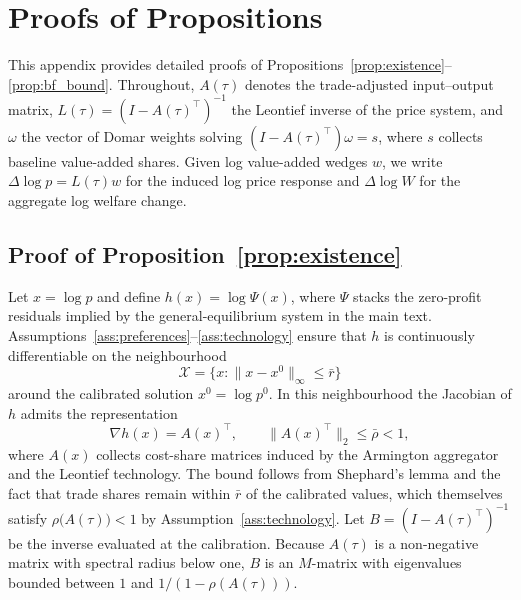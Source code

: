 \section{Proofs of Propositions}\label{app:proofs}
This appendix provides detailed proofs of Propositions~\ref{prop:existence}--\ref{prop:bf_bound}. Throughout, $A(\tau)$ denotes the trade-adjusted input--output matrix, $L(\tau) = (I-A(\tau)^{\top})^{-1}$ the Leontief inverse of the price system, and $\omega$ the vector of Domar weights solving $(I-A(\tau)^{\top})\omega = s$, where $s$ collects baseline value-added shares. Given log value-added wedges $w$, we write $\Delta \log p = L(\tau)w$ for the induced log price response and $\Delta \log W$ for the aggregate log welfare change.

\subsection{Proof of Proposition~\ref{prop:existence}}
Let $x = \log p$ and define $h(x) = \log \Psi(x)$, where $\Psi$ stacks the zero-profit residuals implied by the general-equilibrium system in the main text. Assumptions~\ref{ass:preferences}--\ref{ass:technology} ensure that $h$ is continuously differentiable on the neighbourhood
\begin{equation*}
    \mathcal{X} = \bigl\{x : \|x - x^0\|_\infty \leq \bar{r}\bigr\}
\end{equation*}
around the calibrated solution $x^0 = \log p^0$. In this neighbourhood the Jacobian of $h$ admits the representation
\begin{equation}
\label{eq:h-jac}
    \nabla h(x) = A(x)^{\top}, \qquad \|A(x)^{\top}\|_2 \leq \bar{\rho} < 1,
\end{equation}
where $A(x)$ collects cost-share matrices induced by the Armington aggregator and the Leontief technology. The bound follows from Shephard's lemma and the fact that trade shares remain within $\bar{r}$ of the calibrated values, which themselves satisfy $\rho\bigl(A(\tau)\bigr) < 1$ by Assumption~\ref{ass:technology}. Let $B = (I-A(\tau)^{\top})^{-1}$ be the inverse evaluated at the calibration. Because $A(\tau)$ is a non-negative matrix with spectral radius below one, $B$ is an $M$-matrix with eigenvalues bounded between $1$ and $1/(1-\rho(A(\tau)))$.

